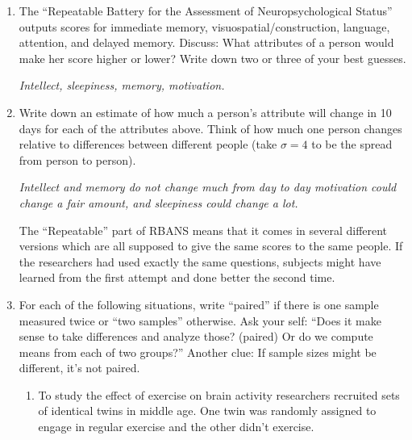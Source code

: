   \begin{enumerate}
  \item The ``Repeatable Battery for the Assessment of
    Neuropsychological Status'' outputs scores for immediate memory,
    visuospatial/construction, language, attention, and delayed
    memory.  Discuss: What attributes of a person would make her score
    higher or lower?  Write down two or three of your best guesses.
\begin{students}
    \vspace{2cm}    
\end{students}

\begin{key}
  {\it Intellect, sleepiness, memory, motivation.}
\end{key}


  \item Write down an estimate of how much a person's attribute will
    change in 10 days for each of the attributes above.  Think of how
    much one person changes relative to differences between different
    people (take $\sigma = 4$ to be the spread from person to person). \begin{students}
    \vspace{2cm}    
\end{students}

\begin{key}
  {\it Intellect and memory do not change much from day to day
    motivation could change a fair amount, and  sleepiness could
    change a lot.}
\end{key}


The ``Repeatable'' part of RBANS means that it comes in several
different versions which are all supposed to give the same scores to
the same people.  If the researchers had used exactly the same
questions, subjects might have learned from the first attempt and done
better the second time.


  \item  For each of the following situations, write ``paired'' if
    there is one sample measured twice or ``two samples'' otherwise.
    Ask your self: ``Does it make sense to take differences and
    analyze those? (paired) Or do we compute means from each of two groups?''
     Another clue: If sample sizes might be different, it's not
     paired. 
 
    \begin{enumerate}
    \item To study the effect of exercise on brain activity
      researchers recruited sets of identical twins in middle age.
      One twin was randomly assigned to engage in regular
      exercise and the other didn't exercise. 
\begin{students}
 \vspace{1cm}
\end{students}


\end{enumerate}
\end{enumerate}
